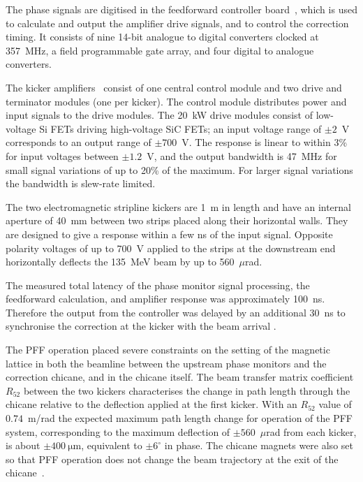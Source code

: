 \documentclass[%
 reprint,
 superscriptaddress,
 amsmath,
 amssymb,
 prl,
]{revtex4-1}
\begin{document}
The phase signals are digitised  in the feedforward controller
board~\cite{RobertsThesis}, which is used to calculate and output the amplifier 
drive signals, and to  control the correction timing. It consists of nine 
14-bit analogue to digital converters clocked at 357~MHz, a field programmable 
gate array, and four digital to analogue converters. 

The kicker amplifiers~\cite{RobertsThesis} consist of one central control 
module and two drive and terminator modules (one per kicker). The control 
module distributes power and input signals to the 
drive modules. The 20~kW drive modules consist of low-voltage Si FETs driving 
high-voltage SiC FETs; an input voltage range of \(\pm2\)~V corresponds to an 
output range of \(\pm700\)~V. The response is linear to within 3\% for input 
voltages between \(\pm1.2\)~V, and the output bandwidth is 47~MHz for small 
signal variations of up to 20\% of the maximum. For larger signal variations 
the bandwidth is slew-rate limited.

The two electromagnetic stripline kickers \cite{kickerIPAC11} are 1~m in length 
and have an internal aperture of 40~mm between two strips placed along their 
horizontal walls. They are designed to give a response within a few ns of the 
input signal.
Opposite polarity voltages of up to 700~V applied to the 
strips at the downstream end horizontally deflects the 135~MeV 
beam by up to 560~\(\mu\)rad.

The measured total latency of the phase monitor signal processing, the 
feedforward calculation, and amplifier response was approximately 100~ns. 
Therefore the output from the controller was delayed by an additional 30~ns to 
synchronise the correction at the kicker with the beam arrival 
\cite{RobertsThesis}.

The PFF operation placed severe constraints on the setting of the 
magnetic lattice in both the beamline between the upstream phase monitors and 
the correction chicane, and in  the chicane itself.
The beam transfer matrix coefficient \(R_{52}\) between the two kickers 
characterises the change in path length through the chicane relative to the 
deflection applied at the first kicker. 
With an \(R_{52}\) value of \(0.74\)~m/rad \cite{RobertsThesis} the expected 
maximum path length change for operation of the PFF system, corresponding to 
the maximum deflection of \(\pm560\)~\(\mu\)rad from each kicker, is about 
\(\pm400~\mathrm{\mu m}\), equivalent to \(\pm6^\circ\) in phase. 
The chicane magnets were also set so that PFF operation does not change the 
beam trajectory at the exit of the chicane~\cite{RobertsThesis}.
\end{document}
